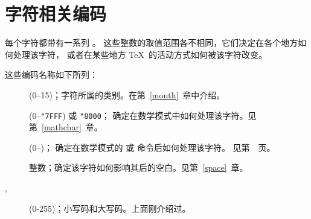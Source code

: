 \documentclass{book}
\begin{document}
\section{字符相关编码}
\label{codename}

每个字符都带有一系列 。
这些整数的取值范围各不相同，它们决定在各个地方如何处理该字符，
或者在某些地方 \TeX\ 的活动方式如何被该字符改变。

这些编码名称如下所列：
\begin{description}\item []
 (0--15)；字符所属的类别。在第~\ref{mouth}~章中介绍。
\item []
 (0--\verb-"7FFF-) 或 \verb-"8000-；
确定在数学模式中如何处理该字符。见第~\ref{mathchar}~章。
\item []
 (0--)；
确定在数学模式的  或  命令后如何处理该字符。
见第~\pageref{delcodes}~页。
\item []
整数；确定该字符如何影响其后的空白。见第~\ref{space}~章。
\item [, ]
 (0-255)；小写码和大写码。上面刚介绍过。
\end{description}
\end{document}
